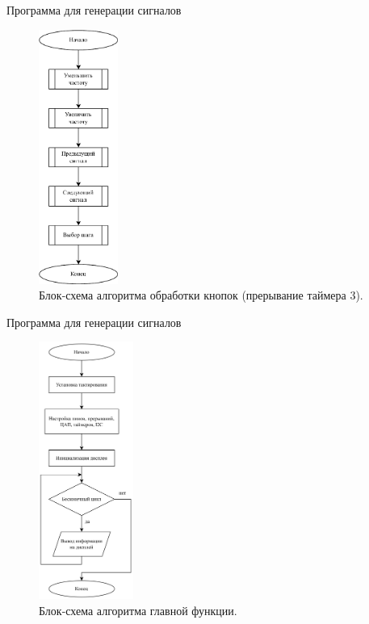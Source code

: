 \documentclass[10pt]{beamer}
\begin{document}
\begin{frame}{Программа для генерации сигналов}
  \begin{figure}
  \includegraphics[width=0.23\textwidth]{buttons}
  \caption*{Блок-схема алгоритма обработки кнопок (прерывание таймера 3).}
  \end{figure}
\end{frame}

\begin{frame}{Программа для генерации сигналов}
  \begin{figure}
  \includegraphics[width=0.275\textwidth]{main}
  \caption*{Блок-схема алгоритма главной функции.}
  \end{figure}
\end{frame}
\end{document}
